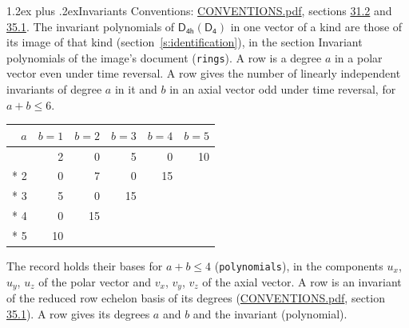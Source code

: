 \documentclass[10pt,a4paper]{article}
\makeatletter
\renewcommand\section{\@startsection{section}{1}{\z@}{-3ex plus -1ex minus -.2ex}%
  {1.2ex plus .2ex}{\normalfont\large\sffamily\bfseries\color{parttitle}}}
\numberwithin{equation}{section}
\newcommand{\grp}[1]{\mathsf{#1}}
\makeatother
\begin{document}
\section{Invariants}\label{s:invariants}
Conventions: \href{../../CONVENTIONS.pdf}{CONVENTIONS.pdf}, sections \href{../../CONVENTIONS.pdf\#conv.31.2}{31.2} and \href{../../CONVENTIONS.pdf\#conv.35.1}{35.1}.
The invariant polynomials of $\grp{D_{4h}}(\grp{D_{4}})$ in one vector of a kind are those of its image of that kind (section~\ref{s:identification}), in the section Invariant polynomials of the image's document (\texttt{rings}).
\leavevmode\label{n:index.degree.polar}\label{n:index.degree.axial}A row is a degree $a$ in a polar vector even under time reversal. A row gives the number of linearly independent invariants of degree $a$ in it and $b$ in an axial vector odd under time reversal, for $a + b \le 6$.
{\small\begin{longtable}{@{}rrrrrr@{}}\toprule
$a$ & $b = 1$ & $b = 2$ & $b = 3$ & $b = 4$ & $b = 5$\\\midrule\endhead
\bottomrule\endfoot\endlastfoot
1 & 2 & 0 & 5 & 0 & 10\\*
2 & 0 & 7 & 0 & 15 & \\*
3 & 5 & 0 & 15 &  & \\*
4 & 0 & 15 &  &  & \\*
5 & 10 &  &  &  & \\
\bottomrule\end{longtable}}
\leavevmode\label{n:local.component.polar}\label{n:local.component.axial}The record holds their bases for $a + b \le 4$ (\texttt{polynomials}), in the components $u_{x}$, $u_{y}$, $u_{z}$ of the polar vector and $v_{x}$, $v_{y}$, $v_{z}$ of the axial vector. \label{n:head.polynomial}A row is an invariant of the reduced row echelon basis of its degrees (\href{../../CONVENTIONS.pdf}{CONVENTIONS.pdf}, section \href{../../CONVENTIONS.pdf\#conv.35.1}{35.1}). A row gives its degrees $a$ and $b$ and the invariant (polynomial).
\end{document}
